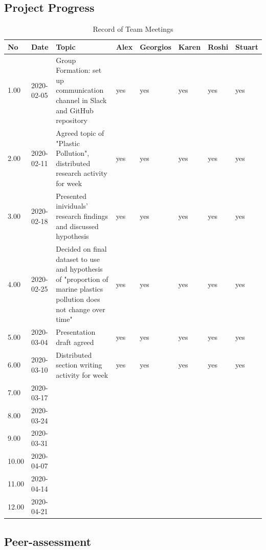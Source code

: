 \documentclass[10pt]{article}\usepackage[]{graphicx}\usepackage[]{color}
\begin{document}
\subsection{Project Progress}
\begin{table}[ht]
\centering
\caption{Record of Team Meetings} 
\label{tab:one}
\begin{tabular}{llp{8cm}lllll}
  \hline
No & Date & Topic & Alex & Georgios & Karen & Roshi & Stuart \\ 
  \hline
1.00 & 2020-02-05 & Group Formation: set up communication channel in Slack and GitHub repository & yes & yes & yes & yes & yes \\ 
  2.00 & 2020-02-11 & Agreed topic of "Plastic Pollution", distributed research activity for week & yes & yes & yes & yes & yes \\ 
  3.00 & 2020-02-18 & Presented inividuals' research findings and discussed hypothesis & yes & yes & yes & yes & yes \\ 
  4.00 & 2020-02-25 & Decided on final dataset to use and hypothesis of "proportion of marine plastics pollution does not change over time" & yes & yes & yes & yes & yes \\ 
  5.00 & 2020-03-04 & Presentation draft agreed & yes & yes & yes & yes & yes \\ 
  6.00 & 2020-03-10 & Distributed section writing activity for week & yes & yes & yes & yes & yes \\ 
  7.00 & 2020-03-17 &  &  &  &  &  &  \\ 
  8.00 & 2020-03-24 &  &  &  &  &  &  \\ 
  9.00 & 2020-03-31 &  &  &  &  &  &  \\ 
  10.00 & 2020-04-07 &  &  &  &  &  &  \\ 
  11.00 & 2020-04-14 &  &  &  &  &  &  \\ 
  12.00 & 2020-04-21 &  &  &  &  &  &  \\ 
   \hline
\end{tabular}
\end{table}





\subsection{Peer-assessment}
\end{document}
